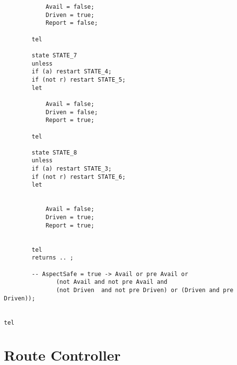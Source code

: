 \begin{verbatim}
			Avail = false;
			Driven = true;
			Report = false;
		
		tel
		
		state STATE_7
		unless
		if (a) restart STATE_4;
		if (not r) restart STATE_5;
		let
			
			Avail = false;
			Driven = false;
			Report = true;
		
		tel
		
		state STATE_8
		unless
		if (a) restart STATE_3;
		if (not r) restart STATE_6;
		let
			
			
			Avail = false;
			Driven = true;
			Report = true;	
				
				
		tel
		returns .. ;
		
		-- AspectSafe = true -> Avail or pre Avail or 
               (not Avail and not pre Avail and 
               (not Driven  and not pre Driven) or (Driven and pre Driven));
		

tel

\end{verbatim}

\section{Route Controller}


